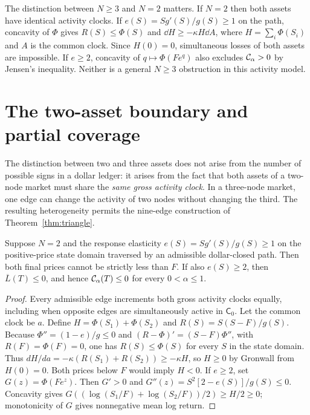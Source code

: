 \documentclass[review,hidelinks,onefignum,onetabnum]{siamonline250211}%
\begin{document}
\begin{remark}
The distinction between $N\ge3$ and $N=2$ matters. If $N=2$ then both
assets have identical activity clocks. If $e(S)=Sg'(S)/g(S)\ge1$ on the path,
concavity of $\Phi$ gives $R(S)\le\Phi(S)$ and
$\dd H\ge-\kappa H\dd A$, where $H=\sum_i\Phi(S_i)$ and $A$ is the common
clock. Since $H(0)=0$, simultaneous losses of both assets are impossible.
If $e\ge2$, concavity of $q\mapsto\Phi(Fe^q)$ also excludes
$\mathcal{C}_\alpha>0$ by Jensen's inequality. Neither is a general
$N\ge3$ obstruction in this activity model.
\end{remark}


\section{The two-asset boundary and partial coverage}\label{sec:twoasset}
The distinction between two and three assets does not arise from the number
of possible signs in a dollar ledger: it arises from the fact that both assets
of a two-node market must share the \emph{same gross activity clock}. In a
three-node market, one edge can change the activity of two nodes without
changing the third. The resulting heterogeneity permits the nine-edge
construction of Theorem~\ref{thm:triangle}.

\begin{proposition}\label{prop:two-node-barriers}
Suppose $N=2$ and the response elasticity
$e(S)=Sg'(S)/g(S)\ge1$ on the positive-price state domain traversed
by an admissible dollar-closed path. Then both final prices cannot be
strictly less than $F$. If also $e(S)\ge2$, then
$\overline L(T)\le0$, and hence $\mathcal{C}_\alpha(T)\le0$ for every
$0<\alpha\le1$.
\end{proposition}
\begin{proof}
Every admissible edge increments both gross activity clocks equally,
including when opposite edges are simultaneously active in $\mathsf C_0$.
Let the common clock be $a$. Define $H=\Phi(S_1)+\Phi(S_2)$ and
$R(S)=S(S-F)/g(S)$. Because $\Phi''=(1-e)/g\le0$ and
$(R-\Phi)'=(S-F)\Phi''$, with $R(F)=\Phi(F)=0$,
one has $R(S)\le\Phi(S)$ for every $S$ in the state domain.
Thus $dH/da=-\kappa(R(S_1)+R(S_2))\ge-\kappa H$,
so $H\ge0$ by Gronwall from $H(0)=0$. Both prices below $F$
would imply $H<0$. If $e\ge2$, set $G(z)=\Phi(Fe^z)$.
Then $G'>0$ and $G''(z)=S^2[2-e(S)]/g(S)\le0$.
Concavity gives $G((\log(S_1/F)+\log(S_2/F))/2)\ge H/2\ge0$;
monotonicity of $G$ gives nonnegative mean log return.
\end{proof}
\end{document}
